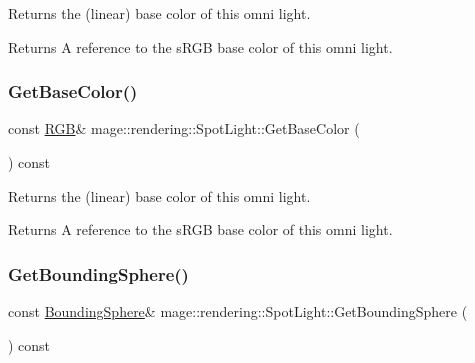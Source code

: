 Returns the (linear) base color of this omni light.

\begin{DoxyReturn}{Returns}
A reference to the s\+R\+GB base color of this omni light. 
\end{DoxyReturn}
\mbox{\label{classmage_1_1rendering_1_1_spot_light_a66cf454577d92d091f6505f3ff52148f}} 
\subsubsection{\texorpdfstring{Get\+Base\+Color()}{GetBaseColor()}\hspace{0.1cm}{\footnotesize\ttfamily [2/2]}}
{\footnotesize\ttfamily const \mbox{\hyperlink{structmage_1_1_r_g_b}{R\+GB}}\& mage\+::rendering\+::\+Spot\+Light\+::\+Get\+Base\+Color (\begin{DoxyParamCaption}{ }\end{DoxyParamCaption}) const\hspace{0.3cm}{\ttfamily [noexcept]}}

Returns the (linear) base color of this omni light.

\begin{DoxyReturn}{Returns}
A reference to the s\+R\+GB base color of this omni light. 
\end{DoxyReturn}
\mbox{\label{classmage_1_1rendering_1_1_spot_light_a003e42ab1d3059ae5750893bcaa8e0b3}} 
\subsubsection{\texorpdfstring{Get\+Bounding\+Sphere()}{GetBoundingSphere()}}
{\footnotesize\ttfamily const \mbox{\hyperlink{classmage_1_1_bounding_sphere}{Bounding\+Sphere}}\& mage\+::rendering\+::\+Spot\+Light\+::\+Get\+Bounding\+Sphere (\begin{DoxyParamCaption}{ }\end{DoxyParamCaption}) const\hspace{0.3cm}{\ttfamily [noexcept]}}

